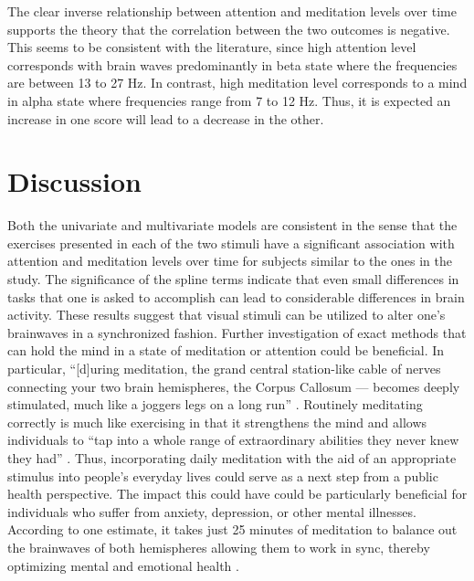 \documentclass{article}[12pt]
\begin{document}
The clear inverse relationship between attention and meditation levels over time supports the theory that the correlation between the two outcomes is negative. This seems to be consistent with the literature, since high attention level corresponds with brain waves predominantly in beta state where the frequencies are between 13 to 27 Hz. In contrast, high meditation level corresponds to a mind in alpha state where frequencies range from 7 to 12 Hz. Thus,  it is expected an increase in one score will lead to a decrease in the other.

\section{Discussion}

Both the univariate and multivariate models are consistent in the sense that the exercises presented in each of the two stimuli have a significant association with attention and meditation levels over time for subjects similar to the ones in the study.  The significance of the spline terms indicate that even small differences in tasks that one is asked to accomplish can lead to considerable differences in brain activity.  These results suggest that visual stimuli can be utilized to alter one's brainwaves in a synchronized fashion. Further investigation of exact methods that can hold the mind in a state of meditation or attention could be beneficial. In particular,
``[d]uring meditation, the grand central station-like cable of nerves connecting your two brain hemispheres, the Corpus Callosum --- becomes deeply stimulated, much like a joggers legs on a long run'' \cite{infinisync}.  Routinely meditating correctly is much like exercising in that it strengthens the mind and allows individuals to ``tap into a whole range of extraordinary abilities they never knew they had'' \cite{infinisync}. Thus, incorporating daily meditation with the aid of an appropriate stimulus into people's everyday lives could serve as a next step from a public health perspective.  The impact this could have could be particularly beneficial for individuals who suffer from anxiety, depression, or other mental illnesses. According to one estimate, it takes just 25 minutes of meditation to balance out the brainwaves of both hemispheres allowing them to work in sync, thereby optimizing mental and emotional health \cite{infinisync}.
\end{document}
